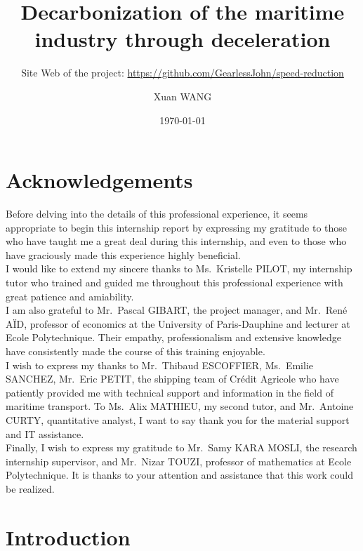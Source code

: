 \documentclass[a4paper,12pt]{article}
\author{Xuan WANG}
\date{\today}
\title{Decarbonization of the maritime industry through deceleration}
\subtitle{Site Web of the project: \url{https://github.com/GearlessJohn/speed-reduction}}%
\begin{document}
\maketitle

\newpage
\thispagestyle{empty}
\section*{Acknowledgements}

Before delving into the details of this professional experience, it seems appropriate to begin this internship report by expressing my gratitude to those who have taught me a great deal during this internship, and even to those who have graciously made this experience highly beneficial.\\

I would like to extend my sincere thanks to Ms.~Kristelle PILOT, my internship tutor who trained and guided me throughout this professional experience with great patience and amiability.\\

I am also grateful to Mr.~Pascal GIBART, the project manager, and Mr.~René AÏD, professor of economics at the University of Paris-Dauphine and lecturer at Ecole Polytechnique.
Their empathy, professionalism and extensive knowledge have consistently made the course of this training enjoyable.\\

I wish to express my thanks to Mr.~Thibaud ESCOFFIER, Ms.~Emilie SANCHEZ, Mr.~Eric PETIT, the shipping team of Crédit Agricole who have patiently provided me with technical support and information in the field of maritime transport.
To Ms.~Alix MATHIEU, my second tutor, and Mr.~Antoine CURTY, quantitative analyst, I want to say thank you for the material support and IT assistance.\\

Finally, I wish to express my gratitude to Mr.~Samy KARA MOSLI, the research internship supervisor, and Mr.~Nizar TOUZI, professor of mathematics at Ecole Polytechnique.
It is thanks to your attention and assistance that this work could be realized.




\newpage
\thispagestyle{empty}
\tableofcontents


\renewcommand{\thepage}{\arabic{page}}

\newpage
\setcounter{page}{1}
\section{Introduction}
\end{document}
